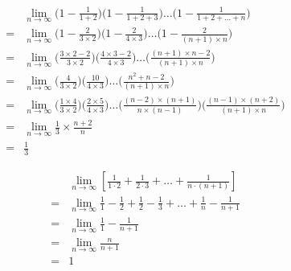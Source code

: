 \begin{align*}
	&\lim_{n\rightarrow\infty}\Big(1-\frac{1}{1+2}\Big)\Big(1-\frac{1}{1+2+3}\Big)\dots\Big(1-\frac{1}{1+2+\dots+n}\Big)\\
	=&\lim_{n\rightarrow\infty}\Big(1-\frac{2}{3\times2}\Big)\Big(1-\frac{2}{4\times3}\Big)\dots\Big(1-\frac{2}{(n+1)\times{n}}\Big)\\
	=&\lim_{n\rightarrow\infty}\Big(\frac{3\times2-2}{3\times2}\Big)\Big(\frac{4\times3-2}{4\times3}\Big)\dots\Big(\frac{(n+1)\times{n}-2}{(n+1)\times{n}}\Big)\\
	=&\lim_{n\rightarrow\infty}\Big(\frac{4}{3\times2}\Big)\Big(\frac{10}{4\times3}\Big)\dots\Big(\frac{n^2+n-2}{(n+1)\times{n}}\Big)\\
	=&\lim_{n\rightarrow\infty}\Big(\frac{1\times4}{3\times2}\Big)\Big(\frac{2\times5}{4\times3}\Big)\dots\Big(\frac{(n-2)\times(n+1)}{n\times(n-1)}\Big)\Big(\frac{(n-1)\times(n+2)}{(n+1)\times{n}}\Big)\\
	=&\lim_{n\rightarrow\infty}\frac{1}{3}\times\frac{n+2}{n}\\
	=&\frac{1}{3}
\end{align*}	

\begin{align*}
	&\lim_{n\rightarrow\infty}[\frac{1}{1\cdot2}+\frac{1}{2\cdot3}+\dots+\frac{1}{n\cdot(n+1)}]\\
	=&\lim_{n\rightarrow\infty} \frac{1}{1}-\frac{1}{2}+\frac{1}{2}-\frac{1}{3}+\dots+\frac{1}{n}-\frac{1}{n+1}\\
	=&\lim_{n\rightarrow\infty}\frac{1}{1}-\frac{1}{n+1}\\
	=&\lim_{n\rightarrow\infty}\frac{n}{n+1}\\
	=&1
\end{align*}

